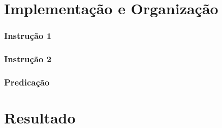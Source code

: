 \documentclass{article}
\begin{document}
    \section{Implementação e Organização}


    \subsubsection{Instrução 1}

    \subsubsection{Instrução 2}

    \subsubsection{Predicação}

    \section{Resultado}

\end{document}
